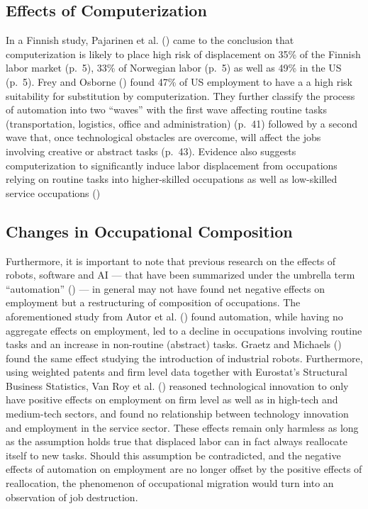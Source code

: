 \documentclass[
  12pt,
  a4paperpaper,
]{article}
\begin{document}
\subsection{Effects of
Computerization}\label{sec-effects-of-computerization}

In a Finnish study, Pajarinen et al.
() came to the
conclusion that computerization is likely to place high risk of
displacement on 35\% of the Finnish labor market (p.~5), 33\% of
Norwegian labor (p.~5) as well as 49\% in the US (p.~5). Frey and
Osborne () found 47\% of US
employment to have a a high risk suitability for substitution by
computerization. They further classify the process of automation into
two ``waves'' with the first wave affecting routine tasks
(transportation, logistics, office and administration) (p.~41) followed
by a second wave that, once technological obstacles are overcome, will
affect the jobs involving creative or abstract tasks (p.~43). Evidence
also suggests computerization to significantly induce labor displacement
from occupations relying on routine tasks into higher-skilled
occupations as well as low-skilled service occupations
()

\subsection{Changes in Occupational
Composition}\label{sec-changes-of-occupational-composition}

Furthermore, it is important to note that previous research on the
effects of robots, software and AI --- that have been summarized under
the umbrella term ``automation'' () --- in general may not have found net
negative effects on employment but a restructuring of composition of
occupations. The aforementioned study from Autor et al.
() found automation,
while having no aggregate effects on employment, led to a decline in
occupations involving routine tasks and an increase in non-routine
(abstract) tasks. Graetz and Michaels
() found the same effect
studying the introduction of industrial robots. Furthermore, using
weighted patents and firm level data together with Eurostat's Structural
Business Statistics, Van Roy et al.
() reasoned
technological innovation to only have positive effects on employment on
firm level as well as in high-tech and medium-tech sectors, and found no
relationship between technology innovation and employment in the service
sector. These effects remain only harmless as long as the assumption
holds true that displaced labor can in fact always reallocate itself to
new tasks. Should this assumption be contradicted, and the negative
effects of automation on employment are no longer offset by the positive
effects of reallocation, the phenomenon of occupational migration would
turn into an observation of job destruction.
\end{document}
